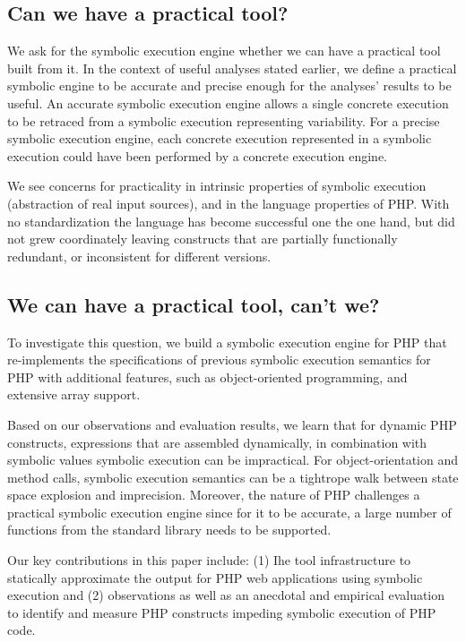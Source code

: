 \documentclass{sig-alternate-05-2015}
\begin{document}
\subsection*{Can we have a practical tool?}
We ask for the symbolic execution engine whether we can have a practical tool built from it. In the context of useful analyses stated earlier, we define a practical symbolic engine to be accurate and precise enough for the analyses' results to be useful. 
An accurate symbolic execution engine allows a single concrete execution to be retraced from a symbolic execution representing variability. For a precise symbolic execution engine, each concrete execution represented in a symbolic execution could have been performed by a concrete execution engine.

We see concerns for practicality in intrinsic properties of symbolic execution (abstraction of real input sources), and in the language properties of PHP. With no standardization the language has become successful one the one hand, but did not grew coordinately leaving constructs that are partially  functionally redundant, or inconsistent for different versions.  

\subsection*{We can have a practical tool, can't we?}
To investigate this question, we build a symbolic execution engine for PHP that re-implements the specifications of previous symbolic execution semantics \cite{Nguyen:2014:BCG:2635868.2635928} for PHP with additional features, such as object-oriented programming, and extensive array support. 

Based on our observations and evaluation results, we learn that for dynamic PHP constructs, expressions that are assembled dynamically, in combination with symbolic values symbolic execution can be impractical. For object-orientation and method calls, symbolic execution semantics can be a tightrope walk between state space explosion and imprecision. Moreover, the nature of PHP challenges a practical symbolic execution engine since  for it to be accurate, a large number of functions from the standard library needs to be supported.

Our key contributions in this paper include: (1) Ihe tool infrastructure to statically approximate the output for PHP web applications using symbolic execution and (2) observations as well as an anecdotal and empirical evaluation to identify and measure PHP constructs impeding symbolic execution of PHP code.
\end{document}
